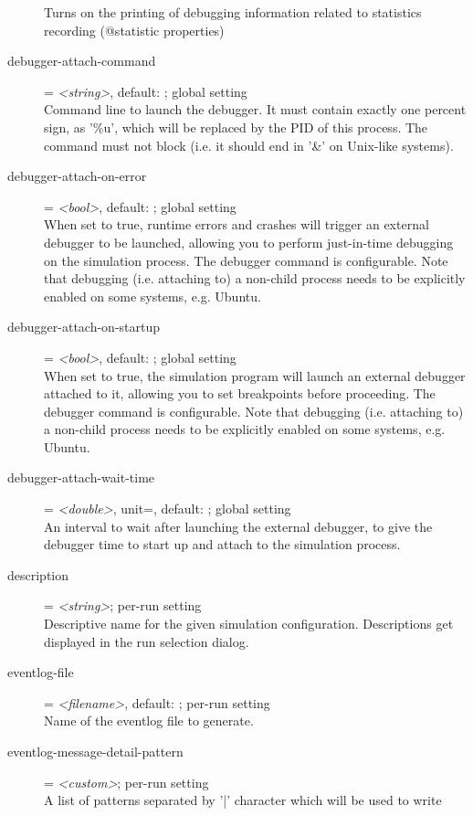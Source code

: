 \begin{description}
    Turns on the printing of debugging information related to statistics
    recording (@statistic properties)
\item[debugger-attach-command] = \textit{<string>}, default: ; global setting \\
    Command line to launch the debugger. It must contain exactly one percent
    sign, as '\%u', which will be replaced by the PID of this process. The
    command must not block (i.e. it should end in '\&' on Unix-like systems).
\item[debugger-attach-on-error] = \textit{<bool>}, default: ; global setting \\
    When set to true, runtime errors and crashes will trigger an external
    debugger to be launched, allowing you to perform just-in-time debugging on
    the simulation process. The debugger command is configurable. Note that
    debugging (i.e. attaching to) a non-child process needs to be explicitly
    enabled on some systems, e.g. Ubuntu.
\item[debugger-attach-on-startup] = \textit{<bool>}, default: ; global setting \\
    When set to true, the simulation program will launch an external debugger
    attached to it, allowing you to set breakpoints before proceeding. The
    debugger command is configurable.  Note that debugging (i.e. attaching to)
    a non-child process needs to be explicitly enabled on some systems, e.g.
    Ubuntu.
\item[debugger-attach-wait-time] = \textit{<double>}, unit=, default: ; global setting \\
    An interval to wait after launching the external debugger, to give the
    debugger time to start up and attach to the simulation process.
\item[description] = \textit{<string>}; per-run setting \\
    Descriptive name for the given simulation configuration. Descriptions get
    displayed in the run selection dialog.
\item[eventlog-file] = \textit{<filename>}, default: ; per-run setting \\
    Name of the eventlog file to generate.
\item[eventlog-message-detail-pattern] = \textit{<custom>}; per-run setting \\
    A list of patterns separated by '|' character which will be used to write

\end{description}
